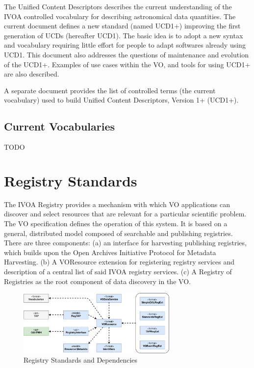 \documentclass[11pt,a4paper]{ivoa}
\begin{document}
The Unified Content Descriptors describes the current understanding of the IVOA controlled 
vocabulary for describing astronomical data quantities. The current document defines a 
new standard (named UCD1+) improving the first generation of UCDs (hereafter UCD1). The 
basic idea is to adopt a new syntax and vocabulary requiring little effort for people to 
adapt softwares already using UCD1. This document also addresses the questions of maintenance 
and evolution of the UCD1+. Examples of use cases within the VO, and tools for using UCD1+ 
are also described. 

A separate document provides the list of controlled terms (the current vocabulary) used to 
build Unified Content Descriptors, Version 1+ (UCD1+). 

\subsection{Current Vocabularies}

TODO

\section{Registry Standards}

The IVOA Registry provides a mechanism with which VO applications can discover and select 
resources that are relevant for a particular scientific problem. The VO specification defines 
the operation of this system. It is based on a general, distributed model composed of searchable 
and publishing registries. There are three components: (a) an interface for harvesting publishing 
registries, which builds upon the Open Archives Initiative Protocol for Metadata Harvesting. 
(b) A VOResource extension for registering registry services and description of a central list 
of said IVOA registry services. (c) A Registry of Registries as the root component of data discovery 
in the VO. 

\begin{figure}[h]
\centering
\includegraphics[width=0.70\textwidth]{ivoa-arch-registry.png}
\caption{Registry Standards and Dependencies}
\label{fig:regdeps}
\end{figure}
\end{document}
